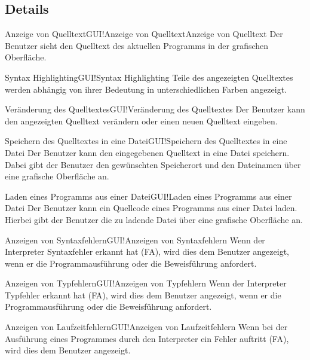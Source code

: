 \documentclass[a4paper,10pt]{article}
\begin{document}
\subsection{Details}
\begin{FA}{Anzeige von Quelltext}{GUI!Anzeige von Quelltext}{Anzeige von Quelltext}
Der Benutzer sieht den Quelltext des aktuellen Programms in der grafischen Oberfl\"{a}che.
\end{FA}
\begin{FA}{Syntax Highlighting}{GUI!Syntax Highlighting}
Teile des angezeigten Quelltextes werden abh\"{a}ngig von ihrer Bedeutung in unterschiedlichen Farben angezeigt. 
\end{FA}
\begin{FA}{Ver\"{a}nderung des Quelltextes}{GUI!Ver\"{a}nderung des Quelltextes}
Der Benutzer kann den angezeigten Quelltext ver\"{a}ndern oder einen neuen Quelltext eingeben.
\end{FA}
\begin{FA}{Speichern des Quelltextes in eine Datei}{GUI!Speichern des Quelltextes in eine Datei}
Der Benutzer kann den eingegebenen Quelltext in eine Datei speichern. Dabei gibt der Benutzer den gew\"{u}nschten Speicherort und den Dateinamen \"{u}ber eine grafische Oberfl\"{a}che an.
\end{FA}
\begin{FA}{Laden eines Programms aus einer Datei}{GUI!Laden eines Programms aus einer Datei}
Der Benutzer kann ein Quellcode eines Programms aus einer Datei laden. Hierbei gibt der Benutzer die zu ladende Datei \"{u}ber eine grafische Oberfl\"{a}che an.
\end{FA}
\begin{FA}{Anzeigen von Syntaxfehlern}{GUI!Anzeigen von Syntaxfehlern}
Wenn der Interpreter Syntaxfehler erkannt hat (FA), wird dies dem Benutzer angezeigt, wenn er die Programmausf\"{u}hrung oder die Beweisf\"{u}hrung anfordert.
\end{FA}
\begin{FA}{Anzeigen von Typfehlern}{GUI!Anzeigen von Typfehlern}
Wenn der Interpreter Typfehler erkannt hat (FA), wird dies dem Benutzer angezeigt, wenn er die Programmausf\"{u}hrung oder die Beweisf\"{u}hrung anfordert.
\end{FA}
\begin{FA}{Anzeigen von Laufzeitfehlern}{GUI!Anzeigen von Laufzeitfehlern}
Wenn bei der Ausf\"{u}hrung eines Programmes durch den Interpreter ein Fehler auftritt (FA), wird dies dem Benutzer angezeigt.
\end{FA}
\end{document}
